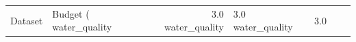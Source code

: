 \begin{tabular}{llrlrrr}
\toprule
Dataset & Budget (%
\midrule
water_quality & 3.0%
water_quality & 3.0%
water_quality & 3.0%
\bottomrule
\end{tabular}
